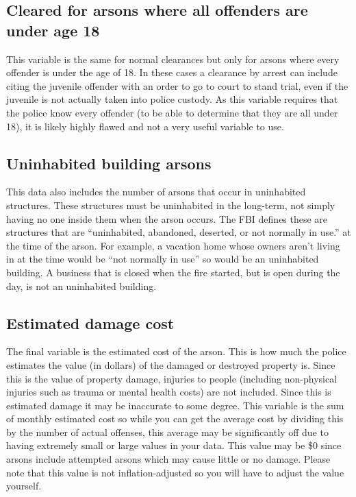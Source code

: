 \documentclass[
  12pt,
  openany]{book}
\begin{document}
\hypertarget{cleared-for-arsons-where-all-offenders-are-under-age-18}{%
\subsection{Cleared for arsons where all offenders are under age 18}\label{cleared-for-arsons-where-all-offenders-are-under-age-18}}

This variable is the same for normal clearances but only for arsons where every offender is under the age of 18. In these cases a clearance by arrest can include citing the juvenile offender with an order to go to court to stand trial, even if the juvenile is not actually taken into police custody. As this variable requires that the police know every offender (to be able to determine that they are all under 18), it is likely highly flawed and not a very useful variable to use.

\hypertarget{uninhabited-building-arsons}{%
\subsection{Uninhabited building arsons}\label{uninhabited-building-arsons}}

This data also includes the number of arsons that occur in uninhabited structures. These structures must be uninhabited in the long-term, not simply having no one inside them when the arson occurs. The FBI defines these are structures that are ``uninhabited, abandoned, deserted, or not normally in use.'' at the time of the arson. For example, a vacation home whose owners aren't living in at the time would be ``not normally in use'' so would be an uninhabited building. A business that is closed when the fire started, but is open during the day, is not an uninhabited building.

\hypertarget{estimated-damage-cost}{%
\subsection{Estimated damage cost}\label{estimated-damage-cost}}

The final variable is the estimated cost of the arson. This is how much the police estimates the value (in dollars) of the damaged or destroyed property is. Since this is the value of property damage, injuries to people (including non-physical injuries such as trauma or mental health costs) are not included. Since this is estimated damage it may be inaccurate to some degree. This variable is the sum of monthly estimated cost so while you can get the average cost by dividing this by the number of actual offenses, this average may be significantly off due to having extremely small or large values in your data. This value may be \$0 since arsons include attempted arsons which may cause little or no damage. Please note that this value is not inflation-adjusted so you will have to adjust the value yourself.
\end{document}
